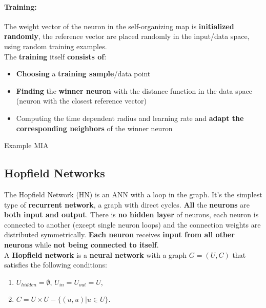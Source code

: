 \documentclass[11pt]{article}
\begin{document}
		\paragraph{Training:} The weight vector of the neuron in the self-organizing map is \textbf{initialized randomly}, the reference vector are placed randomly in the input/data space, using random training examples.\\
		
		The \textbf{training} itself \textbf{consists of}: 
		\begin{itemize}
			\item \textbf{Choosing} a \textbf{training sample}/data point
			\item \textbf{Finding} the \textbf{winner neuron} with the distance function in the data space (neuron with the closest reference vector)
			\item Computing the time dependent radius and learning rate and \textbf{adapt the corresponding neighbors} of the winner neuron
		\end{itemize}
		
		\vfill
		
		Example MIA
		
		
		\newpage
		
		\subsection{Hopfield Networks}
		The Hopfield Network (HN) is an ANN with a loop in the graph. It's the simplest type of \textbf{recurrent network}, a graph with direct cycles. \textbf{All} the \textbf{neurons} are \textbf{both input and output}. There is \textbf{no hidden layer} of neurons, each neuron is connected to another (except single neuron loops) and the connection weights are distributed symmetrically. \textbf{Each neuron} receives \textbf{input from all other neurons} while \textbf{not being connected to itself}.\\
		
		A \textbf{Hopfield network} is a \textbf{neural network} with a graph $G = (U, C)$ that satisfies the following conditions:
		\begin{enumerate}
			\item $U_{hidden} = \emptyset$, $U_{in} = U_{out} = U$,
			\item $C = U \times U - \{(u, u) | u \in U \}$.
		\end{enumerate}
		
\end{document}
